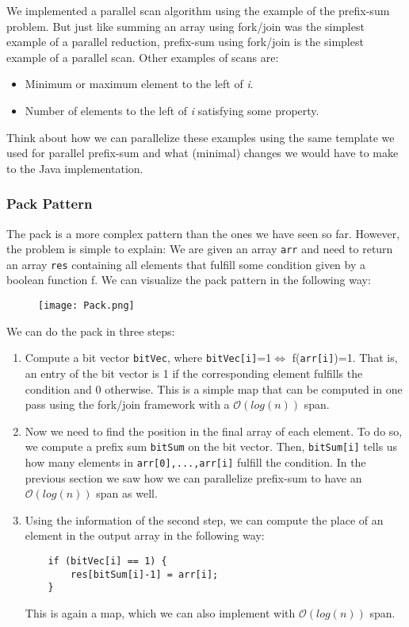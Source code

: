 \documentclass[main.tex]{subfiles}
\begin{document}
We implemented a parallel scan algorithm using the example of the prefix-sum problem. But just like summing an array using fork/join was the simplest example of a parallel reduction, prefix-sum using fork/join is the simplest example of a parallel scan. Other examples of scans are:

\begin{itemize}
  \item Minimum or maximum element to the left of \textit{i}.
  \item Number of elements to the left of \textit{i} satisfying some property.
\end{itemize}

\noindent Think about how we can parallelize these examples using the same template we used for parallel prefix-sum and what (minimal) changes we would have to make to the Java implementation.

\subsubsection{Pack Pattern}
The pack is a more complex pattern than the ones we have seen so far. However, the problem is simple to explain: We are given an array \texttt{arr} and need to return an array \texttt{res} containing all elements that fulfill some condition given by a boolean function f. We can visualize the pack pattern in the following way:

\begin{figure}[H]
    \centering
    \texttt{[image: Pack.png]}
\end{figure}

\noindent We can do the pack in three steps:

\begin{enumerate}
  \item Compute a bit vector \texttt{bitVec}, where \texttt{bitVec[i]}=1\(\iff\) f(\texttt{arr[i]})=1. That is, an entry of the bit vector is 1 if the corresponding element fulfills the condition and 0 otherwise. This is a simple map that can be computed in one pass using the fork/join framework with a \(\mathcal{O}(log(n))\) span.
  \item Now we need to find the position in the final array of each element. To do so, we compute a prefix sum \texttt{bitSum} on the bit vector. Then, \texttt{bitSum[i]} tells us how many elements in \texttt{arr[0],...,arr[i]} fulfill the condition. In the previous section we saw how we can parallelize prefix-sum to have an \(\mathcal{O}(log(n))\) span as well.
  \item Using the information of the second step, we can compute the place of an element in the output array in the following way:
    \begin{verbatim}
    if (bitVec[i] == 1) {
        res[bitSum[i]-1] = arr[i];
    }
    \end{verbatim}
    This is again a map, which we can also implement with \(\mathcal{O}(log(n))\) span.
\end{enumerate}
\end{document}
